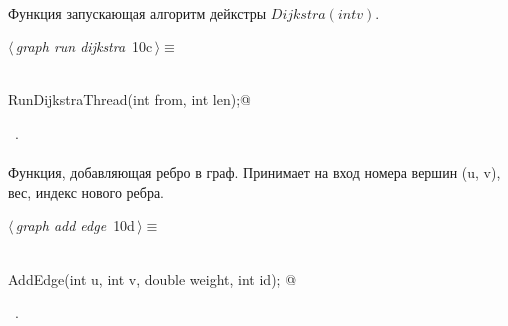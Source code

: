 \documentclass[12pt]{article}
\begin{document}
\paragraph{}
Функция запускающая алгоритм дейкстры $Dijkstra(int v)$.
\begin{flushleft} \small
\begin{minipage}{\linewidth}\label{scrap18}\raggedright\small
{} $\langle\,${\itshape graph run dijkstra}\nobreak\ {\footnotesize {10c}}$\,\rangle\equiv$
\vspace{-1ex}
\begin{list}{}{} \item
\mbox{}\verb@@\\
\mbox{}\verb@void RunDijkstraThread(int from, int len);@\\
\mbox{}\verb@@{\NWsep}
\end{list}
\vspace{-1.5ex}
\footnotesize
\begin{list}{}{\setlength{\itemsep}{-\parsep}\setlength{\itemindent}{-\leftmargin}}
\item \NWtxtMacroRefIn\ .

\item{}
\end{list}
\end{minipage}\vspace{4ex}
\end{flushleft}
\paragraph{}
Функция, добавляющая ребро в граф. Принимает на вход номера вершин (u, v), вес, индекс нового ребра.
\begin{flushleft} \small
\begin{minipage}{\linewidth}\label{scrap19}\raggedright\small
{} $\langle\,${\itshape graph add edge}\nobreak\ {\footnotesize {10d}}$\,\rangle\equiv$
\vspace{-1ex}
\begin{list}{}{} \item
\mbox{}\verb@@\\
\mbox{}\verb@void AddEdge(int u, int v, double weight, int id);   @\\
\mbox{}\verb@@{\NWsep}
\end{list}
\vspace{-1.5ex}
\footnotesize
\begin{list}{}{\setlength{\itemsep}{-\parsep}\setlength{\itemindent}{-\leftmargin}}
\item \NWtxtMacroRefIn\ .

\item{}
\end{list}
\end{minipage}\vspace{4ex}
\end{flushleft}
\end{document}
